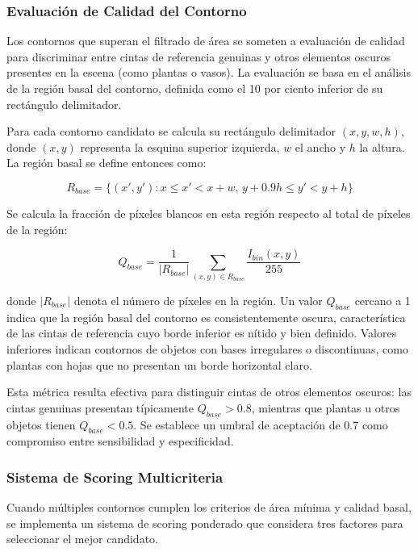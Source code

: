 \subsubsection{Evaluación de Calidad del Contorno}

Los contornos que superan el filtrado de área se someten a evaluación de calidad para discriminar entre cintas de referencia genuinas y otros elementos oscuros presentes en la escena (como plantas o vasos). La evaluación se basa en el análisis de la región basal del contorno, definida como el 10 por ciento inferior de su rectángulo delimitador.

Para cada contorno candidato se calcula su rectángulo delimitador $(x, y, w, h)$, donde $(x,y)$ representa la esquina superior izquierda, $w$ el ancho y $h$ la altura. La región basal se define entonces como:

\begin{equation}
R_{base} = \{(x',y') : x \leq x' < x+w, \, y+0.9h \leq y' < y+h\}
\end{equation}

Se calcula la fracción de píxeles blancos en esta región respecto al total de píxeles de la región:

\begin{equation}
Q_{base} = \frac{1}{|R_{base}|} \sum_{(x,y) \in R_{base}} \frac{I_{bin}(x,y)}{255}
\end{equation}

donde $|R_{base}|$ denota el número de píxeles en la región. Un valor $Q_{base}$ cercano a 1 indica que la región basal del contorno es consistentemente oscura, característica de las cintas de referencia cuyo borde inferior es nítido y bien definido. Valores inferiores indican contornos de objetos con bases irregulares o discontinuas, como plantas con hojas que no presentan un borde horizontal claro.

Esta métrica resulta efectiva para distinguir cintas de otros elementos oscuros: las cintas genuinas presentan típicamente $Q_{base} > 0.8$, mientras que plantas u otros objetos tienen $Q_{base} < 0.5$. Se establece un umbral de aceptación de 0.7 como compromiso entre sensibilidad y especificidad.

\subsubsection{Sistema de Scoring Multicriteria}

Cuando múltiples contornos cumplen los criterios de área mínima y calidad basal, se implementa un sistema de scoring ponderado que considera tres factores para seleccionar el mejor candidato.

